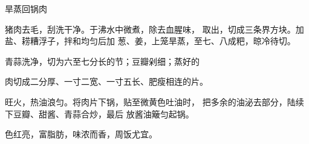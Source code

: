 \begin{recipe}{旱蒸回锅肉}

\ingredients


\cooking

\step 	猪肉去毛，刮洗干净。于沸水中微煮，除去血腥味， 取出，切成三条界方块。加盐、耢糟浮子，拌和均匀后加 葱、姜，上笼旱蒸，至七、八成粑，晾冷待切。

\step 	青蒜洗净，切为六至七分长的节；豆瓣剁细；蒸好的

肉切成二分厚、一寸二宽、一寸五长、肥瘦相连的片。

\step 旺火，热油浪匀。将肉片下锅，贴至微黄色吐油时， 把多余的油泌去部分，陆续下豆瓣、甜酱、青蒜合炒，最后 放酱油簸匀起锅。

\notes

色红亮，富脂肪，味浓而香，周饭尤宜。

\end{recipe}

